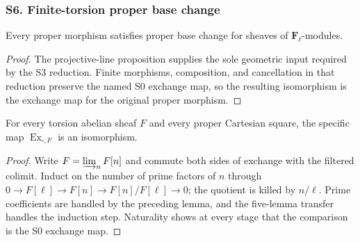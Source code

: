 \subsubsection{S6. Finite-torsion proper base change}

\begin{lemma}
\label{lemma:weil-pbc-prime-proper-base-change}
\uses{}

Every proper morphism satisfies proper base change for sheaves of
$\mathbf F_\ell$-modules.
\end{lemma}
\begin{proof}

The projective-line proposition supplies the sole geometric input required by
the S3 reduction.  Finite morphisms, composition, and cancellation in that
reduction preserve the named S0 exchange map, so the resulting isomorphism is
the exchange map for the original proper morphism.
\end{proof}

\begin{lemma}
\label{lemma:weil-pbc-torsion-assembly}
\uses{}

For every torsion abelian sheaf $F$ and every proper Cartesian square, the
specific map $\operatorname{Ex}_{\square,F}$ is an isomorphism.
\end{lemma}
\begin{proof}

Write $F=\varinjlim_nF[n]$ and commute both sides of exchange with the
filtered colimit.  Induct on the number of prime factors of $n$ through
$0\to F[\ell]\to F[n]\to F[n]/F[\ell]\to0$; the quotient is killed by
$n/\ell$.  Prime coefficients are handled by the preceding lemma, and the
five-lemma transfer handles the induction step.  Naturality shows at every
stage that the comparison is the S0 exchange map.
\end{proof}

